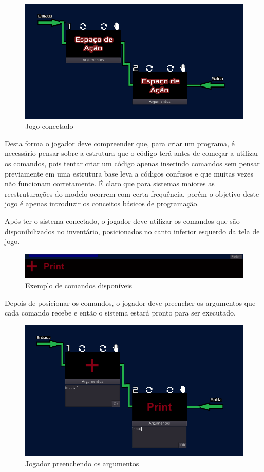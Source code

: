 \begin{figure}[H]
    \includegraphics[width=\textwidth]{../figuras/jogo_conectado.png}
    \caption{Jogo conectado}
\end{figure}

Desta forma o jogador deve compreender que, para criar um programa, é necessário
pensar sobre a estrutura que o código terá antes de começar a utilizar os 
comandos, pois tentar criar um código apenas inserindo comandos sem pensar
previamente em uma estrutura base leva a códigos confusos e que muitas vezes
não funcionam corretamente. É claro que para sistemas maiores as reestruturações
do modelo ocorrem com certa frequência, porém o objetivo deste jogo é apenas
introduzir os conceitos básicos de programação.

Após ter o sistema conectado, o jogador deve utilizar os comandos que são
disponibilizados no inventário, posicionados no canto inferior esquerdo da tela 
de jogo.

\begin{figure}[H]
    \includegraphics[scale=0.5]{../figuras/exemplo_comandos.png}
    \caption{Exemplo de comandos disponíveis}
\end{figure}

Depois de posicionar os comandos, o jogador deve preencher os argumentos que 
cada comando recebe e então o sistema estará pronto para ser executado.

\begin{figure}[H]
    \includegraphics[width=\textwidth]{../figuras/preenchendo_argumentos.png}
    \caption{Jogador preenchendo os argumentos}
\end{figure}

